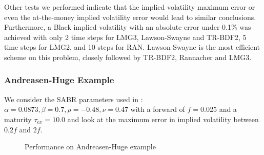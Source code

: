 \documentclass[]{rAMF2e}
\begin{document}
Other tests we performed indicate that the implied volatility maximum error or even the at-the-money implied volatility error would lead to similar conclusions. Furthermore, a Black implied volatility with an absolute error under 0.1\% was achieved with only 2 time steps for LMG3, Lawson-Swayne and TR-BDF2, 5 time steps for LMG2, and 10 steps for RAN. Lawson-Swayne is the most efficient scheme on this problem, closely followed by TR-BDF2, Rannacher and LMG3.

\subsubsection{Andreasen-Huge Example}
We consider the SABR parameters used in \citep{andreasen2011zabr}: $\alpha=0.0873, \beta=0.7, \rho=-0.48, \nu=0.47$ with a forward of $f=0.025$ and a maturity $\tau_{ex}=10.0$ and look at the maximum error in implied volatility between $0.2f$ and $2f$.

\begin{figure}[htb]
  \begin{center}  
    \end{center}
     \caption{\label{fig:perf_ah_500} Performance on Andreasen-Huge example}
\end{figure}


\end{document}

